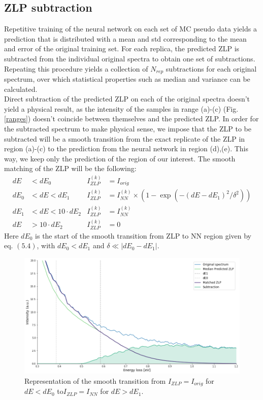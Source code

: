 \documentclass[11pt,a4paper]{article}
\numberwithin{equation}{section}
\numberwithin{figure}{section}
\numberwithin{table}{section}
\begin{document}
\subsection{ZLP subtraction}
Repetitive training of the neural network on each set of MC pseudo data yields a prediction that is distributed with a mean and std corresponding to the mean and error of the original training set. For each replica, the predicted ZLP is subtracted from the individual original spectra to obtain one set of subtractions. Repeating this procedure yields a collection of $N_{rep}$ subtractions for each original spectrum, over which statistical properties such as median and variance can be calculated. \\

Direct subtraction of the predicted ZLP on each of the original spectra doesn't yield a physical result, as the intensity of the samples in range (a)-(c) (Fig. \ref{ranges}) doesn't coincide between themselves and the predicted ZLP. In order for the subtracted spectrum to make physical sense, we impose that the ZLP to be subtracted will be a smooth transition from the exact replicate of the ZLP in region (a)-(c) to the prediction from the neural network in region (d),(e). This way, we keep only the prediction of the region of our interest. The smooth matching of the ZLP will be the following:
\begin{align}
 dE &< dE_0          &   I_{ZLP}^{(k)} &= I_{orig}\\
 dE_0 &< dE < dE_1   &  I_{ZLP}^{(k)} &= I_{NN}^{(k)} \times  \left( 1 - \exp(-(dE - dE_1)^2/\delta^2)\right) \\
 dE_1 &< dE < 10 \cdot dE_2 &  I_{ZLP}^{(k)} &= I_{NN}^{(k)}\\
 dE &> 10 \cdot dE_2 &   I_{ZLP}^{(k)} &= 0
\end{align}
Here $dE_0$ is the start of the smooth transition from ZLP to NN region given by eq. $(5.4)$, with $dE_0<dE_1$  and $\delta \ll |dE_0 - dE_1|$. 

\begin{figure}[H]
    \centering
    \includegraphics[width=120mm]{plots/matching.png}
    \caption{Representation of the smooth transition from $I_{ZLP} = I_{orig}$ for $dE<dE_0$ to$I_{ZLP} = I_{NN}$ for $dE>dE_1$. }
    \label{fig:my_label}
\end{figure}
\end{document}
